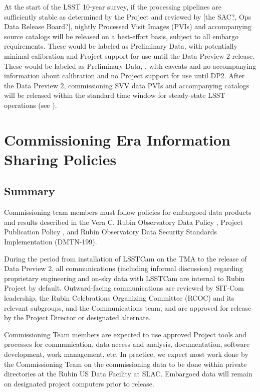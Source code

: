 \documentclass[SE,authoryear,toc,lsstdraft]{lsstdoc}
\begin{document}
At the start of the LSST 10-year survey, if the processing pipelines are sufficiently stable as determined by the Project and reviewed by [the SAC?, Ops Data Release Board?], nightly Processed Visit Images (PVIs) and accompanying source catalogs will be released on a best-effort basis, subject to all embargo requirements. These would be labeled as Preliminary Data, with potentially minimal calibration and Project support for use until the Data Preview 2 release. These would be labeled as Preliminary Data, , with caveats and no accompanying information about calibration and no Project support for use until DP2.  After the Data Preview 2, commissioning SVV data PVIs and accompanying catalogs will be released within the standard time window for steady-state LSST operations (see ).

\section{Commissioning Era Information Sharing Policies}
\label{policy}

\subsection{Summary}

Commissioning team members must follow policies for embargoed data products and results described in the Vera C. Rubin Observatory Data Policy , Project Publication Policy , and Rubin Observatory Data Security Standards Implementation (DMTN-199).

During the period from installation of LSSTCam on the TMA to the release of Data Preview 2, all communications (including informal discussion) regarding proprietary engineering and on-sky data with LSSTCam are internal to Rubin Project by default.
Outward-facing communications are reviewed by SIT-Com leadership, the Rubin Celebrations Organizing Committee (RCOC) and its relevant subgroups, and the Communications team, and are approved for release by the Project Director or designated alternate.

Commissioning Team members are expected to use approved Project tools and processes
for communication, data access and analysis, documentation, software development, work
management, etc.
In practice, we expect most work done by the Commissioning Team on
the commissioning data to be done within private directories at the Rubin US Data Facility at SLAC.
Embargoed data will remain on designated project computers prior to release.
\end{document}
